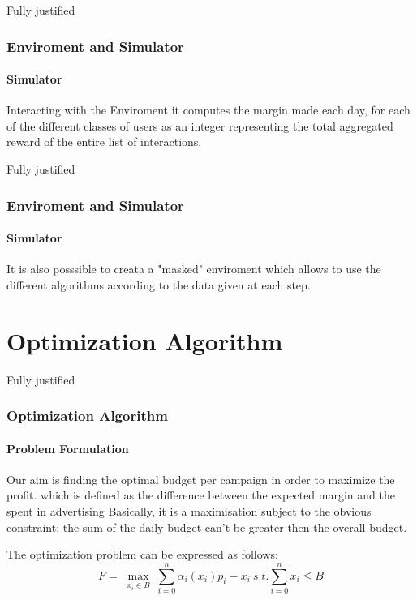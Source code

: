 \documentclass{beamer}
\begin{document}
\begin {frame}{Fully justified}
\frametitle{Enviroment and Simulator}
\framesubtitle{Simulator}
Interacting with the Enviroment it computes the margin made each day, for each of the different classes of users as an integer representing the total aggregated reward of the entire list of interactions.
\end{frame}

\begin {frame}{Fully justified}
\frametitle{Enviroment and Simulator}
\framesubtitle{Simulator}
It is also posssible to creata a "masked" enviroment which allows to use the different algorithms according to the data given at each step.
\end{frame}


\section{Optimization Algorithm}

\AtBeginSection[ ]
{
    \begin{frame}{}
    \tableofcontents[currentsection]
\end{frame}
}

\begin {frame}{Fully justified}
\frametitle{Optimization Algorithm}
\framesubtitle{Problem Formulation}
Our aim is finding the optimal budget per campaign in order to maximize the profit.
which is defined as the difference between the expected margin and the spent in advertising 
Basically, it is a maximisation subject to the obvious constraint: the sum of the daily budget can't be greater then the overall budget.

The optimization problem can be expressed as follows:
\begin{displaymath}
F=\max_{\substack{x_i\in B}} \sum_{i=0}^n \alpha_i(x_i)p_i-x_i \ s.t. \sum_{i=0}^n x_i\leq B  
\end{displaymath}
\end{frame}



\end{document}
